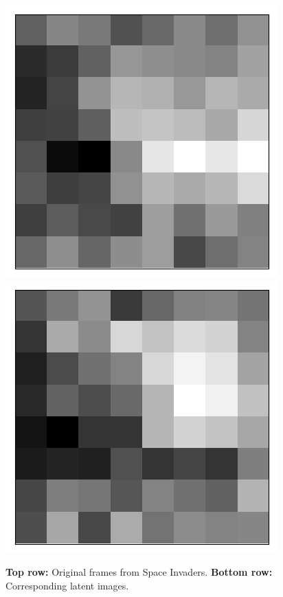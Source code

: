 \begin{figure}[h!]
\begin{multicols}{4}
    \includegraphics[scale=0.3]{figures/results/latent_image/beta_1_sample_70_latent.png}
    \includegraphics[scale=0.3]{figures/results/latent_image/beta_1_sample_90_latent.png}
\end{multicols}
\caption{\textbf{Top row:} Original frames from Space Invaders. \textbf{Bottom row:} Corresponding latent images.}
\label{fig:latent_image_originals_and_latent_spaces}
\end{figure}



